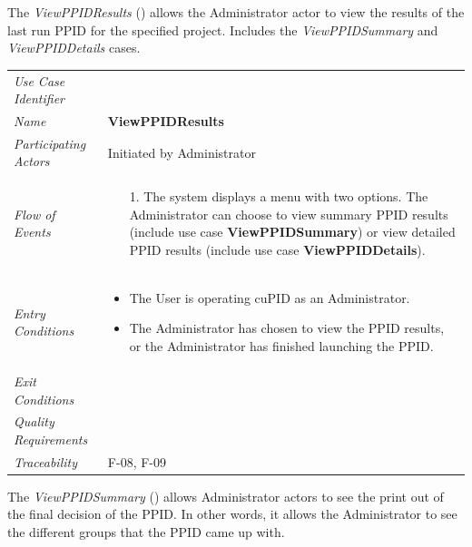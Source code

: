 \documentclass[12pt,letterpaper]{article}
\begin{document}
\vspace{1em}
The {\it ViewPPIDResults} ({\bf \viewppidresults{}}) allows the Administrator actor to view the results of the last run PPID for the specified project. Includes the {\it ViewPPIDSummary} and {\it ViewPPIDDetails} cases.

\begin{center}
	\begin{tabu} to 
		\toprule
		Use Case Identifier & \viewppidresults{} \\
		Name & {\bf ViewPPIDResults} \\
		Participating Actors & Initiated by Administrator \\
		Flow of Events & 
		\begin{minipage}[t]{\linewidth}
		    \begin{enumerate}
		        \item[1.] The system displays a menu with two options. The Administrator can choose to view summary PPID results (include use case \textbf{ViewPPIDSummary}) or view detailed PPID results (include use case \textbf{ViewPPIDDetails}).
			\end{enumerate}
	    \end{minipage} \\

		Entry Conditions &
		\begin{minipage}[t]{\linewidth}
			\begin{itemize}
			    \item The User is operating cuPID as an Administrator.
			    \item The Administrator has chosen to view the PPID results, or the Administrator has finished launching the PPID.
	        \end{itemize}
	    \end{minipage} \\

		Exit Conditions & \\

		Quality Requirements & \\

		Traceability & F-08, F-09 \\
		\toprule
	\end{tabu}
\end{center}

\newpage{}

The {\it ViewPPIDSummary} ({\bf \viewppidsummary{}}) allows Administrator actors to see the print out of the final decision of the PPID. In other words, it allows the Administrator to see the different groups that the PPID came up with.
\end{document}
